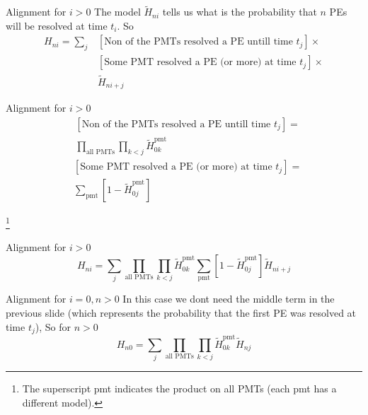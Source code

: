 \documentclass{beamer}
\newcommand\blfootnote[1]{%
  \begingroup
  \renewcommand\thefootnote{}\footnote{#1}%
  \addtocounter{footnote}{-1}%
  \endgroup
}
\begin{document}
\begin{frame}{Alignment for $i>0$}
The model $\tilde{H}_{ni}$ tells us what is the probability that $n$ PEs will be resolved at time $t_i$. So 
\begin{equation}
\begin{split}
H_{ni}=\sum_j&[\text{Non of the PMTs resolved a PE untill time }t_j]\times\\
&[\text{Some PMT resolved a PE (or more) at time }t_j]\times\\
&\tilde{H}_{ni+j}
\end{split}
\end{equation}
\end{frame}

\begin{frame}{Alignment for $i>0$}
\begin{equation}
\begin{split}
&[\text{Non of the PMTs resolved a PE untill time }t_j]=\\
&\prod_{\text{all PMTs}}\prod_{k<j}\tilde{H}_{0k}^{\text{pmt}}
\end{split}
\end{equation}
\begin{equation}
\begin{split}
&[\text{Some PMT resolved a PE (or more) at time }t_j]=\\
&\sum_{\text{pmt}}[1-\tilde{H}_{0j}^{\text{pmt}}]
\end{split}
\end{equation}

\blfootnote{The superscript pmt indicates the product on all PMTs (each pmt has a different model).}
\end{frame}

\begin{frame}{Alignment for $i>0$}
\begin{equation}
H_{ni}=\sum_j\prod_{\text{all PMTs}}\prod_{k<j}\tilde{H}_{0k}^{\text{pmt}}\sum_{\text{pmt}}[1-\tilde{H}_{0j}^{\text{pmt}}]\tilde{H}_{ni+j}
\end{equation}
\end{frame}

\begin{frame}{Alignment for $i=0, n>0$}
In this case we dont need the middle term in the previous slide (which represents the probability that the first PE was resolved at time $t_j$), So for $n>0$
\begin{equation}
H_{n0}=\sum_j\prod_{\text{all PMTs}}\prod_{k<j}\tilde{H}_{0k}^{\text{pmt}}\tilde{H}_{nj}
\end{equation}
\end{frame}
\end{document}
